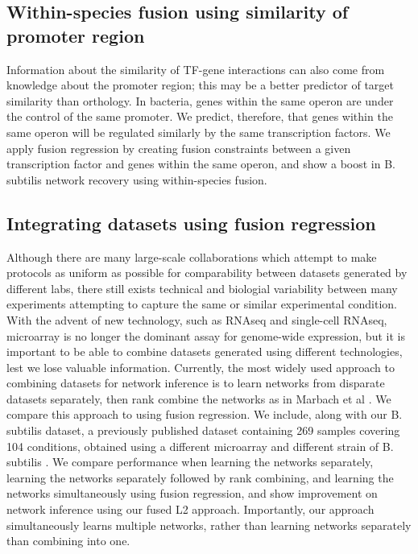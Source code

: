 \documentclass[11pt]{article}
\begin{document}
\subsection{Within-species fusion using similarity of promoter region}
Information about the similarity of TF-gene interactions can also come from knowledge about the promoter region; this may be a better predictor of target similarity than orthology. In bacteria, genes within the same operon are under the control of the same promoter. We predict, therefore, that genes within the same operon will be regulated similarly by the same transcription factors. We apply fusion regression by creating fusion constraints between a given transcription factor and genes within the same operon, and show a boost in B. subtilis network recovery using within-species fusion. 

\subsection{Integrating datasets using fusion regression}
Although there are many large-scale collaborations which attempt to make protocols as uniform as possible for comparability between datasets generated by different labs, there still exists technical and biologial variability between many experiments attempting to capture the same or similar experimental condition. With the advent of new technology, such as RNAseq and single-cell RNAseq, microarray is no longer the dominant assay for genome-wide expression, but it is important to be able to combine datasets generated using different technologies, lest we lose valuable information. Currently, the most widely used approach to combining datasets for network inference is to learn networks from disparate datasets separately, then rank combine the networks as in Marbach et al \cite{marbach_revealing_2010}. We compare this approach to using fusion regression. We include, along with our B. subtilis dataset, a previously published dataset containing 269 samples covering 104 conditions, obtained using a different microarray and different strain of B. subtilis \cite{nicolas2012condition}. We compare performance when learning the networks separately, learning the networks separately followed by rank combining, and learning the networks simultaneously using fusion regression, and show improvement on network inference using our fused L2 approach. Importantly, our approach simultaneously learns multiple networks, rather than learning networks separately than combining into one. 
\end{document}
